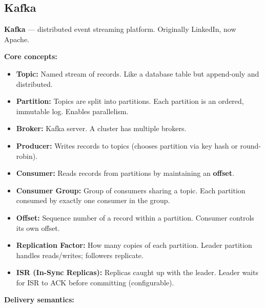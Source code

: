 \documentclass[11pt]{article}
\providecommand{\tightlist}{\setlength{\itemsep}{1pt}\setlength{\parskip}{0pt}}
\begin{document}
\subsection{Kafka}\label{kafka}

\textbf{Kafka} --- distributed event streaming platform. Originally LinkedIn, now Apache.

\textbf{Core concepts:}

\begin{itemize}
\tightlist
\item
  \textbf{Topic:} Named stream of records. Like a database table but append-only and distributed.
\item
  \textbf{Partition:} Topics are split into partitions. Each partition is an ordered, immutable log. Enables parallelism.
\item
  \textbf{Broker:} Kafka server. A cluster has multiple brokers.
\item
  \textbf{Producer:} Writes records to topics (chooses partition via key hash or round-robin).
\item
  \textbf{Consumer:} Reads records from partitions by maintaining an \textbf{offset}.
\item
  \textbf{Consumer Group:} Group of consumers sharing a topic. Each partition consumed by exactly one consumer in the group.
\item
  \textbf{Offset:} Sequence number of a record within a partition. Consumer controls its own offset.
\item
  \textbf{Replication Factor:} How many copies of each partition. Leader partition handles reads/writes; followers replicate.
\item
  \textbf{ISR (In-Sync Replicas):} Replicas caught up with the leader. Leader waits for ISR to ACK before committing (configurable).
\end{itemize}

\textbf{Delivery semantics:}
\end{document}
